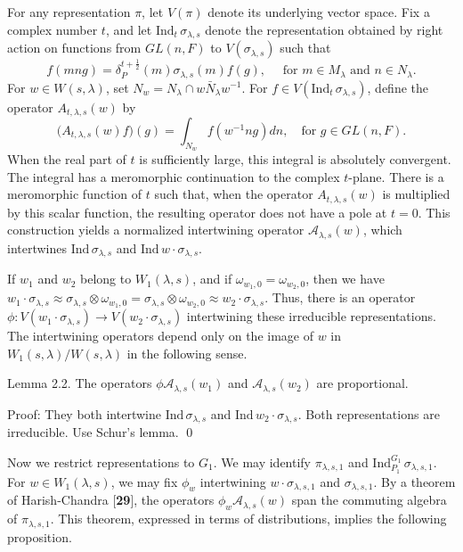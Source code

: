\documentclass{amsart}
\begin{document}
For any representation
  $ \pi $,
let
  $ V(\pi)$
denote its underlying vector space.
Fix a complex number $t$, and let
  $ \text{Ind}_t \, \sigma_{\lambda,s} $
denote the representation obtained by right action on
functions from
  $ GL(n,F) $
to 
  $ V(\sigma_{\lambda,s}) $
such that%
$$
  f(mng) =
  \delta_P^{t+\frac12} (m)
  \sigma_{\lambda,s} (m) f(g),
  \quad\text { for }
  m \in M_{\lambda} \text{ and }n \in N_{\lambda}.
$$
%
For 
  $ w \in W(s,\lambda) $,
set
  $ N_w = N_\lambda \cap w \bar N_\lambda w^{-1} $.
For 
  $ f \in  V
    (\text{Ind}_t \, \sigma_{\lambda,s}) $,
define the operator
  $ A_{t,\lambda,s} (w) $
by
%
$$
  \bigl(
    A_{t,\lambda,s} (w) f
  \bigr)
  (g) =
  \int_{N_w}
  f (w^{-1} ng) dn, 
  \quad 
  \text{for }g \in GL(n,F).
$$
%
When the real part of $t$ is sufficiently large,
this integral is absolutely convergent.  The integral has a meromorphic
continuation to the complex $t$-plane.
There is a meromorphic function of $t$ such that, when
  the operator $ A_{t,\lambda,s} (w) $
is multiplied by this scalar function, the resulting operator does not have
a pole at
  $ t = 0 $. 
This construction yields a normalized intertwining operator
  $ {\mathcal A}_{\lambda,s} (w) $,
which intertwines
  $ \text{Ind} \, \sigma_{\lambda,s} $
and
  $ \text{Ind} \, w \cdot \sigma_{\lambda, s}  $.

If 
  $ w_1 $ and 
  $ w_2$ belong to $W_1 (\lambda,s) $,
and if
  $ \omega_{w_1,0} =
    \omega_{w_2,0} $,
then we have
  $ w_1 \cdot 
    \sigma_{\lambda,s} \approx
    \sigma_{\lambda,s} \otimes
    \omega_{w_1,0} =
    \sigma_{\lambda,s} \otimes
    \omega_{w_2,0} \approx
    w_2 \cdot 
    \sigma_{\lambda,s} $.
Thus, there is an operator 
  $ \phi : 
    V
    (w_1 \cdot \sigma_{\lambda,s})
    \to
    V(w_2 \cdot \sigma_{\lambda,s}) $
intertwining these irreducible representations.
The intertwining operators depend only on the image of $w$
in 
  $ W_1(s,\lambda) /
    W (s,\lambda) $
in the following sense.

\proclaim Lemma {2.2}.
The operators
  $ \phi {\mathcal A}_{\lambda,s} (w_1) $
and
  $ {\mathcal A}_{\lambda,s} (w_2) $
are proportional.
\finishproclaim

\pproclaim Proof:
They both intertwine
  $ \text{Ind}\, \sigma_{\lambda,s} $
and
  $ \text{Ind}\, w_2 \cdot \sigma_{\lambda,s} $.
Both representations are irreducible.
Use Schur's lemma.
\qed
\finishpproclaim

Now we restrict representations to
  $ G_1 $.
We may identify
  $ \pi_{\lambda,s,1} $
and
  $ \text{Ind}_{P_1}^{G_1} \,
     \sigma_{\lambda,s,1} $.
For
  $ w \in W_1 (\lambda,s) $,
we may fix
  $ \phi_w $
intertwining
  $ w \cdot \sigma_{\lambda,s,1} $
and
  $ \sigma_{\lambda,s,1} $.
By a theorem of Harish-Chandra [{\bf 29}],
the operators
  $ \phi_w {\mathcal A}_{\lambda,s} (w) $
span the commuting algebra of 
  $ \pi_{\lambda,s,1} $.
This theorem, expressed in terms of distributions,
implies the following proposition.
\end{document}
